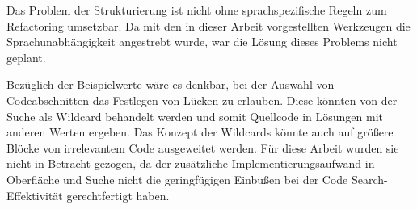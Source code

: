 Das Problem der Strukturierung ist nicht ohne sprachspezifische Regeln zum Refactoring umsetzbar.
Da mit den in dieser Arbeit vorgestellten Werkzeugen die Sprachunabhängigkeit angestrebt wurde, war die Lösung dieses Problems nicht geplant.

Bezüglich der Beispielwerte wäre es denkbar, bei der Auswahl von Codeabschnitten das Festlegen von Lücken zu erlauben.
Diese könnten von der Suche als Wildcard behandelt werden und somit Quellcode in Lösungen mit anderen Werten ergeben.
Das Konzept der Wildcards könnte auch auf größere Blöcke von irrelevantem Code ausgeweitet werden.
Für diese Arbeit wurden sie nicht in Betracht gezogen, da der zusätzliche Implementierungsaufwand in Oberfläche und Suche nicht die geringfügigen Einbußen bei der Code Search-Effektivität gerechtfertigt haben.
